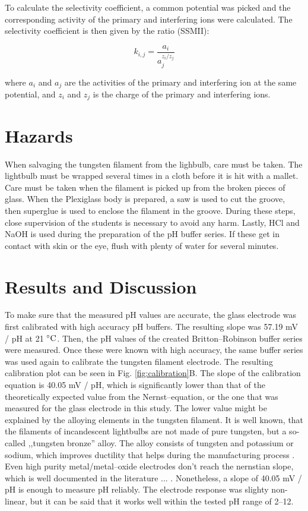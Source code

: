 \documentclass[manuscript=article, journal=jceda8]{achemso}
\begin{document}
To calculate the selectivity coefficient, a common potential was picked and the corresponding activity of the primary and interfering ions were calculated. The selectivity coefficient is then given by the ratio (SSMII):

\begin{equation}
k_{i,j} = \frac{a_i} {a_j^{z_i/z_j}}
\end{equation}

where $a_i$ and $a_j$ are the activities of the primary and interfering ion at the same potential, and $z_i$ and $z_j$ is the charge of the primary and interfering ions.

\section{Hazards}
When salvaging the tungsten filament from the lighbulb, care must be taken. The lightbulb must be wrapped several times in a cloth before it is hit with a mallet. Care must be taken when the filament is picked up from the broken pieces of glass. When the Plexiglass body is prepared, a saw is used to cut the groove, then superglue is used to enclose the filament in the groove. During these steps, close supervision of the students is necessary to avoid any harm. Lastly, HCl and NaOH is used during the preparation of the pH buffer series. If these get in contact with skin or the eye, flush with plenty of water for several minutes.


\section{Results and Discussion}

To make sure that the measured pH values are accurate, the glass electrode was first calibrated with high accuracy pH buffers. The resulting slope was 57.19 mV / pH at 21 $\celsius$. Then, the pH values of the created Britton--Robinson buffer series were measured. Once these were known with high accuracy, the same buffer series was used again to calibrate the tungsten filament electrode. The resulting calibration plot can be seen in Fig. \ref{fig:calibration}B. The slope of the calibration equation is 40.05 mV / pH, which is significantly lower than that of the theoretically expected value from the Nernst--equation, or the one that was measured for the glass electrode in this study. The lower value might be explained by the alloying elements in the tungsten filament. It is well known, that the filaments of incandescent lightbulbs are not made of pure tungsten, but a so-called ,,tungsten bronze'' alloy. The alloy consists of tungsten and potassium or sodium, which improves ductility that helps during the manufacturing process \cite{cisternas2015electrode, wechter1972use, schade2010100}. Even high purity metal/metal--oxide electrodes don't reach the nernstian slope, which is well documented in the literature ... . Nonetheless, a slope of 40.05 mV / pH is enough to measure pH reliably. The electrode response was slighty non-linear, but it can be said that it works well within the tested pH range of 2--12.
\end{document}

